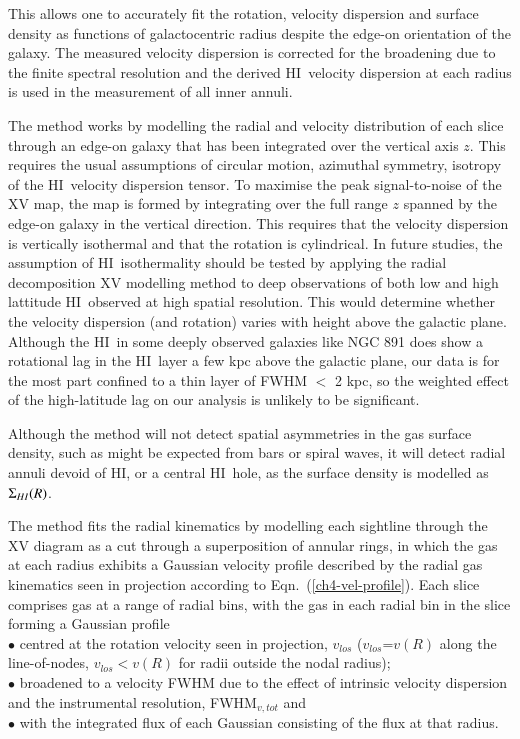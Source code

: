 \documentclass[traditabstract]{aa} %
\newcommand\HI{H{\small I}}
\begin{document}
This allows one to accurately fit the rotation, velocity dispersion
and surface density as functions of galactocentric radius despite the
edge-on orientation of the galaxy. The measured velocity dispersion 
is corrected for the broadening
due to the finite spectral resolution and the derived \HI\ velocity
dispersion at each radius is used in the measurement of all inner
annuli.

The method works by modelling the radial and velocity distribution of
each slice through an edge-on galaxy that has been integrated over the
vertical axis $z$. This requires the usual assumptions of circular 
motion, azimuthal symmetry, 
isotropy of the \HI\ velocity dispersion tensor. To maximise the peak 
signal-to-noise of the XV
map, the map is formed by integrating over the full range $z$ spanned
by the edge-on galaxy in the vertical direction. This requires that
the velocity dispersion is vertically isothermal and that the rotation is
cylindrical.  In future studies, the assumption of \HI\ isothermality 
should be tested by applying the radial decomposition XV modelling method 
to deep observations of both low and high lattitude \HI\ observed at 
high spatial resolution. This would determine whether  the velocity
dispersion (and rotation) varies with height above the galactic plane.
Although the \HI\ in some deeply observed galaxies like NGC 891 
\citep{foss05} does show a rotational lag in the \HI\ layer
a few kpc above the galactic plane, our data is for the most part
confined to a thin layer of FWHM $<$ 2 kpc, so the weighted effect of the
high-latitude lag on our analysis is unlikely to be significant.

Although the method will not detect spatial asymmetries in the gas
surface density, such as might be expected from bars or spiral waves,
it will detect radial annuli devoid of \HI, or a central \HI\ hole,
as the surface density is modelled as $\Sigma_{\HI}(R)$.

The method fits the radial kinematics by modelling each sightline
through the XV diagram as a cut through a superposition of annular rings, in
which the gas at each radius exhibits a Gaussian velocity profile
described by the radial gas kinematics seen in projection according
to Eqn.~(\ref{ch4-vel-profile}). 
Each slice comprises gas at a range of radial bins, with the gas in
each radial bin in the slice forming a Gaussian profile\\
\indent
$\bullet $ centred at the rotation velocity seen in projection, $v_{los}$
($v_{los}$=$v(R)$ along the line-of-nodes, $v_{los} < v(R)$ for radii
outside the nodal radius);\\
\indent
$\bullet $ broadened to a velocity FWHM due to the effect 
  of intrinsic velocity dispersion and the instrumental resolution, 
  FWHM$_{v,tot}$ and\\
\indent
$\bullet $ with the integrated flux of each Gaussian consisting of the
  flux at that radius.
\end{document}
